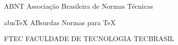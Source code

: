 
\begin{siglas}
	\item[ABNT]{Associação Brasileira de Normas Técnicas}
	\item[abnTeX]{ABsurdas Normas para TeX}
	\item[FTEC]{FACULDADE DE TECNOLOGIA TECBRASIL}
\end{siglas}